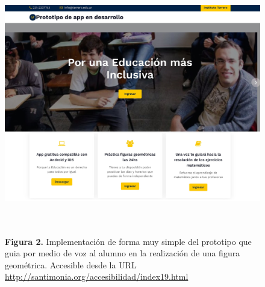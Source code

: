 \documentclass{article}
\begin{document}
\begin{figure}
	\begin{minipage}[c]{0.73\textwidth}
		\includegraphics[width=\textwidth,height=0.5\textheight,keepaspectratio]{santimonia.org.jpg}
	\end{minipage}
	\begin{minipage}[c]{0.25\textwidth}
		\raggedright
	\begin{justify}\\\\
	{\changefontsizes{8.8pt}\textbf{Figura 2.} Implementación de forma muy simple del prototipo que guia por medio de voz al alumno en la realización de una figura geométrica. Accesible desde la URL \url{http://santimonia.org/accesibilidad/index19.html}}
	\end{justify}
	\end{minipage}
	\label{fig:Website}


\end{figure}
\end{document}
